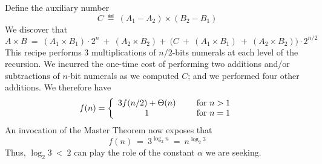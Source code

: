 \begin{itemize}
\begin{enumerate}
Define the auxiliary number
\[ C \ \eqdef \ (A_1 - A_2) \times (B_2 - B_1) \]
We discover that
\[
A \times B \ = \ (A_1 \times B_1) \cdot 2^n \ + \ (A_2 \times B_2) + \ \big(C \ + \ (A_1 \times B_1) \ + \ (A_2 \times B_2) \big) \cdot 2^{n/2}
\]
This recipe performs 3 multiplications of $n/2$-bits numerals at each level of the recursion.  We incurred the one-time cost of performing two additions and/or subtractions of $n$-bit numerals as we computed $C$; and we performed four other additions.   We therefore have
\[
f(n) = \left\{
\begin{array}{cl}
3 f(n/2) + \Theta(n) & \hspace*{.2in} \mbox{for } n > 1 \\
                            1 & \hspace*{.2in} \mbox{for } n = 1
\end{array}
\right. 
\]
An invocation of the Master Theorem now exposes that
\[ f(n) \ = \ 3^{\log_2 n} \ = \ n^{\log_2 3} \]
Thus, $\log_2 3 \ < \ 2$ can play the role of the constant $\alpha$ we are seeking.
\end{enumerate}
\end{itemize}




